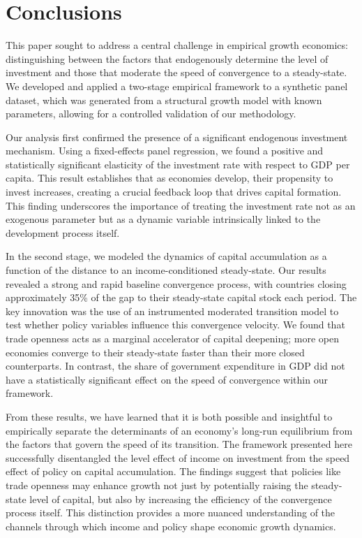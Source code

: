 \documentclass[]{article}
\begin{document}
\section{Conclusions}
\label{sec:conclusions}
This paper sought to address a central challenge in empirical growth economics: distinguishing between the factors that endogenously determine the level of investment and those that moderate the speed of convergence to a steady-state. We developed and applied a two-stage empirical framework to a synthetic panel dataset, which was generated from a structural growth model with known parameters, allowing for a controlled validation of our methodology.

Our analysis first confirmed the presence of a significant endogenous investment mechanism. Using a fixed-effects panel regression, we found a positive and statistically significant elasticity of the investment rate with respect to GDP per capita. This result establishes that as economies develop, their propensity to invest increases, creating a crucial feedback loop that drives capital formation. This finding underscores the importance of treating the investment rate not as an exogenous parameter but as a dynamic variable intrinsically linked to the development process itself.

In the second stage, we modeled the dynamics of capital accumulation as a function of the distance to an income-conditioned steady-state. Our results revealed a strong and rapid baseline convergence process, with countries closing approximately 35\% of the gap to their steady-state capital stock each period. The key innovation was the use of an instrumented moderated transition model to test whether policy variables influence this convergence velocity. We found that trade openness acts as a marginal accelerator of capital deepening; more open economies converge to their steady-state faster than their more closed counterparts. In contrast, the share of government expenditure in GDP did not have a statistically significant effect on the speed of convergence within our framework.

From these results, we have learned that it is both possible and insightful to empirically separate the determinants of an economy's long-run equilibrium from the factors that govern the speed of its transition. The framework presented here successfully disentangled the level effect of income on investment from the speed effect of policy on capital accumulation. The findings suggest that policies like trade openness may enhance growth not just by potentially raising the steady-state level of capital, but also by increasing the efficiency of the convergence process itself. This distinction provides a more nuanced understanding of the channels through which income and policy shape economic growth dynamics.


{}

\end{document}
